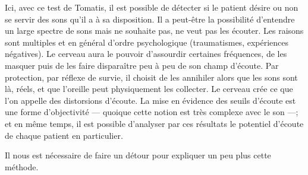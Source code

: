   Ici, avec ce test de Tomatis, il est possible de détecter si le patient désire ou non se servir des sons
  qu'il a à sa disposition. Il a peut-être la possibilité d'entendre un large spectre de
  sons mais ne souhaite pas, ne veut pas les écouter. Les raisons sont multiples et en général d'ordre psychologique (traumatismes,
  expériences négatives). Le cerveau aura le
  pouvoir d'assourdir certaines fréquences, de les masquer puis de les faire disparaître peu à peu de
  son champ d'écoute. Par protection, par réflexe de survie, il choisit de les
  annihiler alors que les sons sont là, réels, et que  l'oreille peut physiquement les collecter. Le cerveau crée ce
  que l'on appelle des distorsions d'écoute\autocite{tomatis:education}.
La mise en évidence des seuils d'écoute est une forme d'objectivité --- quoique cette notion est très complexe avec le son ---; et en même temps,  il est possible d'analyser par ces résultats le potentiel d'écoute de chaque patient en particulier.


Il nous est nécessaire de faire un détour pour expliquer un peu plus cette méthode.
  


